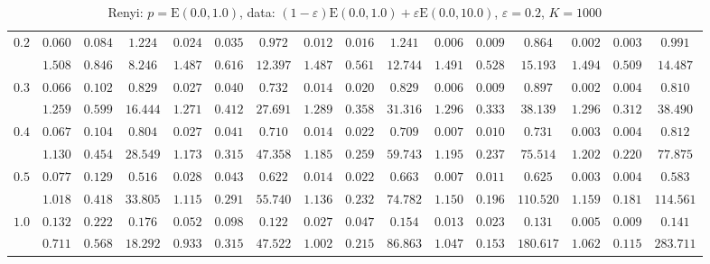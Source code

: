 \begin{table}[ht]
\begin{center}
\begin{tabular}{|c|ccc|ccc|ccc|ccc|ccc|}
\hline 
$0.2$ & $ 0.060 $ & $ 0.084 $ & $ 1.224 $ & $ 0.024 $ & $ 0.035 $ & $ 0.972 $ & $ 0.012 $ & $ 0.016 $ & $ 1.241 $ & $ 0.006 $ & $ 0.009 $ & $ 0.864 $ & $ 0.002 $ & $ 0.003 $ & $ 0.991 $\\ 
 & $ 1.508 $ & $ 0.846 $ & $ 8.246 $ & $ 1.487 $ & $ 0.616 $ & $ 12.397 $ & $ 1.487 $ & $ 0.561 $ & $ 12.744 $ & $ 1.491 $ & $ 0.528 $ & $ 15.193 $ & $ 1.494 $ & $ 0.509 $ & $ 14.487 $\\ 
\hline 
$0.3$ & $ 0.066 $ & $ 0.102 $ & $ 0.829 $ & $ 0.027 $ & $ 0.040 $ & $ 0.732 $ & $ 0.014 $ & $ 0.020 $ & $ 0.829 $ & $ 0.006 $ & $ 0.009 $ & $ 0.897 $ & $ 0.002 $ & $ 0.004 $ & $ 0.810 $\\ 
 & $ 1.259 $ & $ 0.599 $ & $ 16.444 $ & $ 1.271 $ & $ 0.412 $ & $ 27.691 $ & $ 1.289 $ & $ 0.358 $ & $ 31.316 $ & $ 1.296 $ & $ 0.333 $ & $ 38.139 $ & $ 1.296 $ & $ 0.312 $ & $ 38.490 $\\ 
\hline 
$0.4$ & $ 0.067 $ & $ 0.104 $ & $ 0.804 $ & $ 0.027 $ & $ 0.041 $ & $ 0.710 $ & $ 0.014 $ & $ 0.022 $ & $ 0.709 $ & $ 0.007 $ & $ 0.010 $ & $ 0.731 $ & $ 0.003 $ & $ 0.004 $ & $ 0.812 $\\ 
 & $ 1.130 $ & $ 0.454 $ & $ 28.549 $ & $ 1.173 $ & $ 0.315 $ & $ 47.358 $ & $ 1.185 $ & $ 0.259 $ & $ 59.743 $ & $ 1.195 $ & $ 0.237 $ & $ 75.514 $ & $ 1.202 $ & $ 0.220 $ & $ 77.875 $\\ 
\hline 
$0.5$ & $ 0.077 $ & $ 0.129 $ & $ 0.516 $ & $ 0.028 $ & $ 0.043 $ & $ 0.622 $ & $ 0.014 $ & $ 0.022 $ & $ 0.663 $ & $ 0.007 $ & $ 0.011 $ & $ 0.625 $ & $ 0.003 $ & $ 0.004 $ & $ 0.583 $\\ 
 & $ 1.018 $ & $ 0.418 $ & $ 33.805 $ & $ 1.115 $ & $ 0.291 $ & $ 55.740 $ & $ 1.136 $ & $ 0.232 $ & $ 74.782 $ & $ 1.150 $ & $ 0.196 $ & $ 110.520 $ & $ 1.159 $ & $ 0.181 $ & $ 114.561 $\\ 
\hline 
$1.0$ & $ 0.132 $ & $ 0.222 $ & $ 0.176 $ & $ 0.052 $ & $ 0.098 $ & $ 0.122 $ & $ 0.027 $ & $ 0.047 $ & $ 0.154 $ & $ 0.013 $ & $ 0.023 $ & $ 0.131 $ & $ 0.005 $ & $ 0.009 $ & $ 0.141 $\\ 
 & $ 0.711 $ & $ 0.568 $ & $ 18.292 $ & $ 0.933 $ & $ 0.315 $ & $ 47.522 $ & $ 1.002 $ & $ 0.215 $ & $ 86.863 $ & $ 1.047 $ & $ 0.153 $ & $ 180.617 $ & $ 1.062 $ & $ 0.115 $ & $ 283.711 $\\ 
\hline 
\end{tabular}
\caption{Renyi: $p = \mathrm{E}(0.0,1.0)$, data: $(1-\varepsilon)\mathrm{E}(0.0,1.0) + \varepsilon \mathrm{E}(0.0,10.0)$, $\varepsilon =  0.2$, $K = 1000$} 
\end{center}
\end{table}
